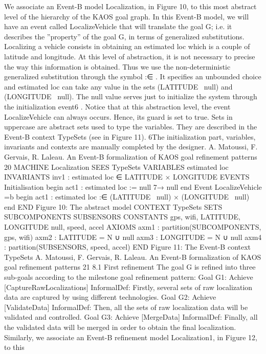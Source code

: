We associate an Event-B model Localization, in Figure 10, to this most abstract level of the
hierarchy of the KAOS goal graph. In this Event-B model, we will have an event called LocalizeVehicle that will translate the goal G; i.e. it describes the ”property” of the goal G, in
terms of generalized substitutions. Localizing a vehicle consists in obtaining an estimated loc
which is a couple of latitude and longitude. At this level of abstraction, it is not necessary to
precise the way this information is obtained. Thus we use the non-deterministic generalized
substitution through the symbol :∈ . It specifies an unbounded choice and estimated loc can
take any value in the sets (LATITUDE \ {null}) and (LONGITUDE \ {null}). The null
value serves just to initialize the system through the initialization event6
. Notice that at
this abstraction level, the event LocalizeVehicle can always occurs. Hence, its guard is set
to true. Sets in uppercase are abstract sets used to type the variables. They are described
in the Event-B context TypeSets (see in Figure 11).
6The initialization part, variables, invariants and contexts are manually completed by the designer.
A. Matoussi, F. Gervais, R. Laleau. An Event-B formalization of KAOS goal refinement patterns 20
MACHINE Localization
SEES TypeSets
VARIABLES
estimated loc
INVARIANTS
inv1 : estimated loc ∈ LATITUDE × LONGITUDE
EVENTS
Initialisation
begin
act1 : estimated loc := null 7→ null
end
Event LocalizeVehicle =b
begin
act1 : estimated loc :∈ (LATITUDE \ {null}) × (LONGITUDE \ {null})
end
END
Figure 10: The abstract model
CONTEXT TypeSets
SETS
SUBCOMPONENTS
SUBSENSORS
CONSTANTS
gps, wifi, LATITUDE, LONGITUDE
null, speed, accel
AXIOMS
axm1 : partition(SUBCOMPONENTS, {gps}, {wifi})
axm2 : LATITUDE = N ∪ {null}
axm3 : LONGITUDE = N ∪ {null}
axm4 : partition(SUBSENSORS, {speed}, {accel})
END
Figure 11: The Event-B context TypeSets
A. Matoussi, F. Gervais, R. Laleau. An Event-B formalization of KAOS goal refinement patterns 21
8.1 First refinement
The goal G is refined into three sub-goals according to the milestone goal refinement pattern:
Goal G1: Achieve [CaptureRawLocalizations]
InformalDef: Firstly, several sets of raw localization data are captured by using different technologies.
Goal G2: Achieve [ValidateData]
InformalDef: Then, all the sets of raw localization data will be validated and controlled.
Goal G3: Achieve [MergeData]
InformalDef: Finally, all the validated data will be merged in order to obtain the
final localization.
Similarly, we associate an Event-B refinement model Localization1, in Figure 12, to this
